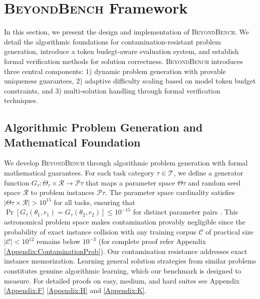 \documentclass{article} %
\theoremstyle{plain}
\theoremstyle{definition}
\newcommand{\our}{\textsc{BeyondBench}\xspace}
\newcommand{\rebuttal}[1]{{\color{RebuttalGreen}#1}}
\begin{document}
\section{\our Framework}


In this section, we present the design and implementation of \our. We detail the algorithmic foundations for contamination-resistant problem generation, introduce a token budegt-aware evaluation system, and establish formal verification methods for solution correctness. \our introduces three central components: 1) dynamic problem generation with provable uniqueness guarantees, 2) adaptive difficulty scaling based on model token budget constraints, and 3) multi-solution handling through formal verification techniques.


\subsection{Algorithmic Problem Generation and Mathematical Foundation}



We develop \our through algorithmic problem generation with formal mathematical guarantees. For each task category $\tau \in \mathcal{T}$, we define a generator function $G_\tau: \Theta_\tau \times \mathcal{R} \rightarrow \mathcal{P}\tau$ that maps a parameter space $\Theta\tau$ and random seed space $\mathcal{R}$ to problem instances $\mathcal{P}\tau$. The parameter space cardinality satisfies $|\Theta\tau \times \mathcal{R}| > 10^{15}$ for all tasks, ensuring that $\Pr[G_\tau(\theta_1, r_1) = G_\tau(\theta_2, r_2)] \le 10^{-15}$ for distinct parameter pairs \citep{mitzenmacher2017probability}. This astronomical problem space makes contamination provably negligible since the probability of exact instance collision with any training corpus $\mathcal{C}$ of practical size $|\mathcal{C}| < 10^{12}$ remains below $10^{-3}$ (for complete proof refer Appendix \ref{Appendix:ContaminationProb}). \rebuttal{Our contamination resistance addresses exact instance memorization. Learning general solution strategies from similar problems constitutes genuine algorithmic learning, which our benchmark is designed to measure.} For detailed proofs on easy, medium, and hard suites see Appendix \ref{Appendix:F} \ref{Appendix:H} and \ref{Appendix:K}.
\end{document}
